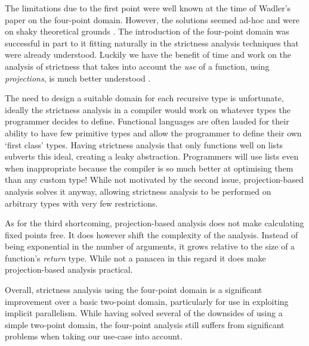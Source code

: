 The limitations due to the first point were well known at the time of Wadler's
paper on the four-point domain. However, the solutions seemed ad-hoc and were
on shaky theoretical grounds . The
introduction of the four-point domain was successful in part to it fitting
naturally in the strictness analysis techniques that were already understood.
Luckily we have the benefit of time and work on the analysis of strictness that
takes into account the \emph{use} of a function, using \emph{projections}, is
much better understood \citep{hinze1995projection, SergeyDemand}.

The need to design a suitable domain for each recursive type is unfortunate,
ideally the strictness analysis in a compiler would work on whatever types the
programmer decides to define. Functional languages are often lauded for their
ability to have few primitive types and allow the programmer to define their
own `first class' types.  Having strictness analysis that only functions well
on lists subverts this ideal, creating a leaky abstraction. Programmers will
use lists even when inappropriate because the compiler is so much better at
optimising them than any custom type! While not motivated by the second issue,
projection-based analysis solves it anyway, allowing strictness analysis to be
performed on arbitrary types with very few restrictions.

As for the third shortcoming, projection-based analysis does not make
calculating fixed points free. It does however shift the complexity of the
analysis. Instead of being exponential in the number of arguments, it grows
relative to the size of a function's \emph{return} type. While not a panacea in
this regard it does make projection-based analysis practical.

Overall, strictness analysis using the four-point domain is a significant
improvement over a basic two-point domain, particularly for use in exploiting
implicit parallelism. While having solved several of the downsides of using
a simple two-point domain, the four-point analysis still suffers from
significant problems when taking our use-case into account.
